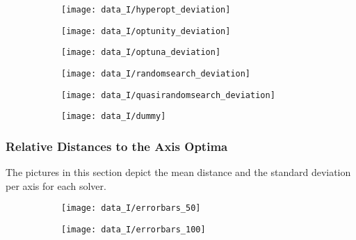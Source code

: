 \begin{figure}[h]
	\begin{subfigure}{0.5\textwidth}
		\texttt{[image: data\_I/hyperopt\_deviation]}
		\label{fig:hyperopt_deviation_I}
	\end{subfigure}
	\begin{subfigure}{0.5\textwidth}
		\texttt{[image: data\_I/optunity\_deviation]}
		\label{fig:optunity_deviation_I}
	\end{subfigure}
\end{figure}

\begin{figure}[h]
	\begin{subfigure}{0.5\textwidth}
		\texttt{[image: data\_I/optuna\_deviation]} 
		\label{fig:optuna_deviation_I}
	\end{subfigure}
	\begin{subfigure}{0.5\textwidth}
		\texttt{[image: data\_I/randomsearch\_deviation]}
		\label{fig:randomsearch_deviation_I}
	\end{subfigure}
\end{figure}

\begin{figure}[h]
	\begin{subfigure}{0.5\textwidth}
		\texttt{[image: data\_I/quasirandomsearch\_deviation]} 
		\label{fig:quasirandomsearch_deviation_I}
	\end{subfigure}
	\begin{subfigure}{0.5\textwidth}
		\texttt{[image: data\_I/dummy]}
		\label{fig:dummy2_I}
	\end{subfigure}
\end{figure}


\newpage


\subsubsection{Relative Distances to the Axis Optima}

The pictures in this section depict the mean distance and the standard deviation per axis for each solver.

\begin{figure}[h]
	\begin{subfigure}{0.5\textwidth}
		\texttt{[image: data\_I/errorbars\_50]}
		\label{fig:errorbars_50_I}
	\end{subfigure}
	\begin{subfigure}{0.5\textwidth}
		\texttt{[image: data\_I/errorbars\_100]}
		\label{fig:errorbars_100_I}
	\end{subfigure}
\end{figure}

